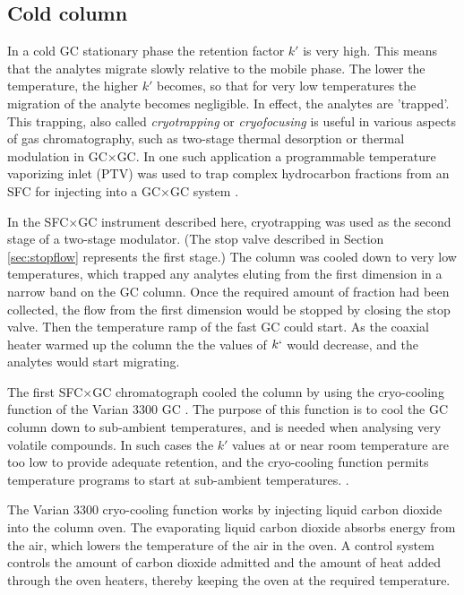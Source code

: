 \subsection{Cold column}
\label{sec:ColdColumn}

In a cold GC stationary phase the retention factor \(k'\) is very high. This
means that the analytes migrate slowly relative to the mobile phase. The lower
the temperature, the higher \(k'\) becomes, so that for very low temperatures
the migration of the analyte becomes negligible. In effect, the analytes are
'trapped'. This trapping, also called \textit{cryotrapping} or
\textit{cryofocusing} is useful in various aspects of gas chromatography, such
as two-stage thermal desorption or thermal modulation in GC×GC. In one such
application a programmable temperature vaporizing inlet (PTV) was used to trap
complex hydrocarbon fractions from an SFC for injecting into a GC×GC system
\autocite{Potgieter2013}.

In the SFC×GC instrument described here, cryotrapping was used as the second
stage of a two-stage modulator. (The stop valve described in Section
\ref{sec:stopflow} represents the first stage.) The column was cooled down to
very low temperatures, which trapped any analytes eluting from the first
dimension in a narrow band on the GC column. Once the required amount of
fraction had been collected, the flow from the first dimension would be stopped
by closing the stop valve. Then the temperature ramp of the fast GC could start.
As the coaxial heater warmed up the column the the values of \(k`\) would
decrease, and the analytes would start migrating.

The first SFC×GC chromatograph cooled the column by using the cryo-cooling
function of the Varian 3300 GC \autocite{Venter2004,Venter2003}. The purpose of
this function is to cool the GC column down to sub-ambient temperatures, and is
needed when analysing very volatile compounds. In such cases the \(k'\) values
at or near room temperature are too low to provide adequate retention, and the
cryo-cooling function permits temperature programs to start at sub-ambient
temperatures. .

The Varian 3300 cryo-cooling function works by injecting liquid carbon dioxide
into the column oven. The evaporating liquid carbon dioxide absorbs energy from the
air, which lowers the temperature of the air in the oven. A control system
controls the amount of carbon dioxide admitted and the amount of heat added
through the oven heaters, thereby keeping the oven at the required temperature.

